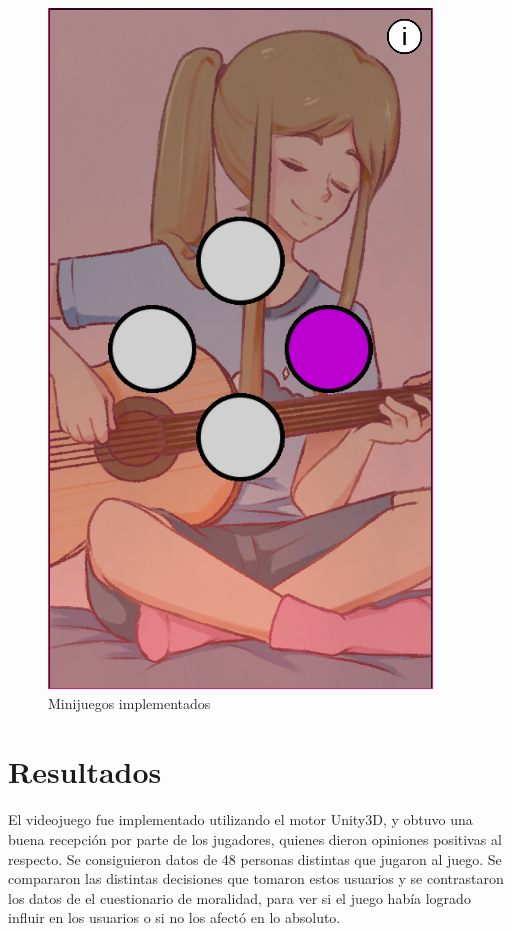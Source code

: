 \documentclass[12pt]{article}
\begin{document}
\begin{figure}[h]
\begin{minipage}{.15\textwidth}
        \includegraphics[width=\textwidth]{imgs/screenshot14.png}
    \end{minipage}
    \caption*{Minijuegos implementados}
\end{figure}

\section{Resultados}
El videojuego fue implementado utilizando el motor Unity3D, y obtuvo una buena recepción por parte de los jugadores, quienes dieron opiniones positivas al respecto.
Se consiguieron datos de 48 personas distintas que jugaron al juego. Se compararon las distintas decisiones que tomaron estos usuarios y se contrastaron los datos de el cuestionario de moralidad, para ver si el juego había logrado influir en los usuarios o si no los afectó en lo absoluto.
\end{document}
